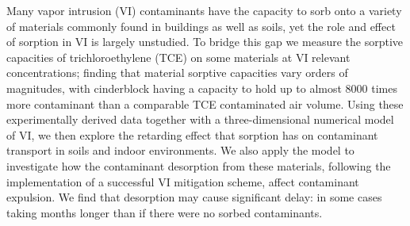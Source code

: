 Many vapor intrusion (VI) contaminants have the capacity to sorb onto a variety of materials commonly found in buildings as well as soils, yet the role and effect of sorption in VI is largely unstudied.
To bridge this gap we measure the sorptive capacities of trichloroethylene (TCE) on some materials at VI relevant concentrations; finding that material sorptive capacities vary orders of magnitudes, with cinderblock having a capacity to hold up to almost 8000 times more contaminant than a comparable TCE contaminated air volume.
Using these experimentally derived data together with a three-dimensional numerical model of VI, we then explore the retarding effect that sorption has on contaminant transport in soils and indoor environments.
We also apply the model to investigate how the contaminant desorption from these materials, following the implementation of a successful VI mitigation scheme, affect contaminant expulsion.
We find that desorption may cause significant delay: in some cases taking months longer than if there were no sorbed contaminants.

